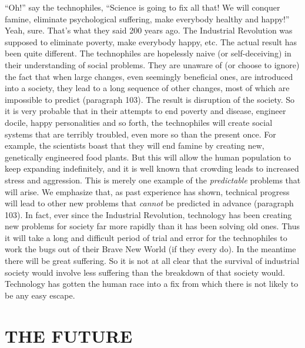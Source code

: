  “Oh!” say the technophiles, “Science is going to fix all that! We will conquer famine, eliminate psychological suffering, make everybody healthy and happy!” Yeah, sure. That’s what they said 200 years ago. The Industrial Revolution was supposed to eliminate poverty, make everybody happy, etc. The actual result has been quite different. The technophiles are hopelessly naive (or self-deceiving) in their understanding of social problems. They are unaware of (or choose to ignore) the fact that when large changes, even seemingly beneficial ones, are introduced into a society, they lead to a long sequence of other changes, most of which are impossible to predict (paragraph 103). The result is disruption of the society. So it is very probable that in their attempts to end poverty and disease, engineer docile, happy personalities and so forth, the technophiles will create social systems that are terribly troubled, even more so than the present once. For example, the scientists boast that they will end famine by creating new, genetically engineered food plants. But this will allow the human population to keep expanding indefinitely, and it is well known that crowding leads to increased stress and aggression. This is merely one example of the {\em predictable} problems that will arise. We emphasize that, as past experience has shown, technical progress will lead to other new problems that {\em cannot} be predicted in advance (paragraph 103). In fact, ever since the Industrial Revolution, technology has been creating new problems for society far more rapidly than it has been solving old ones. Thus it will take a long and difficult period of trial and error for the technophiles to work the bugs out of their Brave New World (if they every do). In the meantime there will be great suffering. So it is not at all clear that the survival of industrial society would involve less suffering than the breakdown of that society would. Technology has gotten the human race into a fix from which there is not likely to be any easy escape.

\chapter{THE FUTURE}

